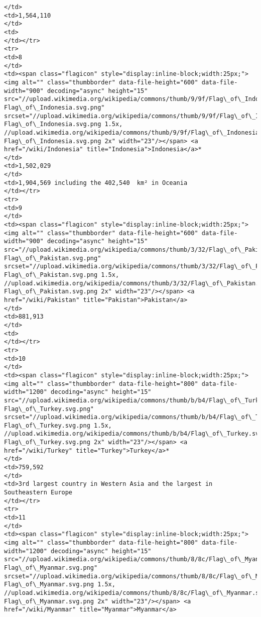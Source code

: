 \documentclass[11pt]{article}
\begin{document}
\begin{Verbatim}[commandchars=\\\{\}]
</td>
<td>1,564,110
</td>
<td>
</td></tr>
<tr>
<td>8
</td>
<td><span class="flagicon" style="display:inline-block;width:25px;"><img alt="" class="thumbborder" data-file-height="600" data-file-width="900" decoding="async" height="15" src="//upload.wikimedia.org/wikipedia/commons/thumb/9/9f/Flag\_of\_Indonesia.svg/23px-Flag\_of\_Indonesia.svg.png" srcset="//upload.wikimedia.org/wikipedia/commons/thumb/9/9f/Flag\_of\_Indonesia.svg/35px-Flag\_of\_Indonesia.svg.png 1.5x, //upload.wikimedia.org/wikipedia/commons/thumb/9/9f/Flag\_of\_Indonesia.svg/45px-Flag\_of\_Indonesia.svg.png 2x" width="23"/></span> <a href="/wiki/Indonesia" title="Indonesia">Indonesia</a>*
</td>
<td>1,502,029
</td>
<td>1,904,569 including the 402,540  km² in Oceania
</td></tr>
<tr>
<td>9
</td>
<td><span class="flagicon" style="display:inline-block;width:25px;"><img alt="" class="thumbborder" data-file-height="600" data-file-width="900" decoding="async" height="15" src="//upload.wikimedia.org/wikipedia/commons/thumb/3/32/Flag\_of\_Pakistan.svg/23px-Flag\_of\_Pakistan.svg.png" srcset="//upload.wikimedia.org/wikipedia/commons/thumb/3/32/Flag\_of\_Pakistan.svg/35px-Flag\_of\_Pakistan.svg.png 1.5x, //upload.wikimedia.org/wikipedia/commons/thumb/3/32/Flag\_of\_Pakistan.svg/45px-Flag\_of\_Pakistan.svg.png 2x" width="23"/></span> <a href="/wiki/Pakistan" title="Pakistan">Pakistan</a>
</td>
<td>881,913
</td>
<td>
</td></tr>
<tr>
<td>10
</td>
<td><span class="flagicon" style="display:inline-block;width:25px;"><img alt="" class="thumbborder" data-file-height="800" data-file-width="1200" decoding="async" height="15" src="//upload.wikimedia.org/wikipedia/commons/thumb/b/b4/Flag\_of\_Turkey.svg/23px-Flag\_of\_Turkey.svg.png" srcset="//upload.wikimedia.org/wikipedia/commons/thumb/b/b4/Flag\_of\_Turkey.svg/35px-Flag\_of\_Turkey.svg.png 1.5x, //upload.wikimedia.org/wikipedia/commons/thumb/b/b4/Flag\_of\_Turkey.svg/45px-Flag\_of\_Turkey.svg.png 2x" width="23"/></span> <a href="/wiki/Turkey" title="Turkey">Turkey</a>*
</td>
<td>759,592
</td>
<td>3rd largest country in Western Asia and the largest in Southeastern Europe
</td></tr>
<tr>
<td>11
</td>
<td><span class="flagicon" style="display:inline-block;width:25px;"><img alt="" class="thumbborder" data-file-height="800" data-file-width="1200" decoding="async" height="15" src="//upload.wikimedia.org/wikipedia/commons/thumb/8/8c/Flag\_of\_Myanmar.svg/23px-Flag\_of\_Myanmar.svg.png" srcset="//upload.wikimedia.org/wikipedia/commons/thumb/8/8c/Flag\_of\_Myanmar.svg/35px-Flag\_of\_Myanmar.svg.png 1.5x, //upload.wikimedia.org/wikipedia/commons/thumb/8/8c/Flag\_of\_Myanmar.svg/45px-Flag\_of\_Myanmar.svg.png 2x" width="23"/></span> <a href="/wiki/Myanmar" title="Myanmar">Myanmar</a>

\end{Verbatim}
\end{document}
